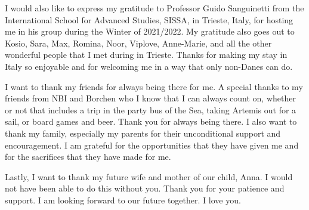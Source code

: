 I would also like to express my gratitude to Professor Guido Sanguinetti from the International School for Advanced Studies, SISSA, in Trieste, Italy, for hosting me in his group during the Winter of 2021/2022. My gratitude also goes out to Kosio, Sara, Max, Romina, Noor, Viplove, Anne-Marie, and all the other wonderful people that I met during in Trieste. Thanks for making my stay in Italy so enjoyable and for welcoming me in a way that only non-Danes can do.

I want to thank my friends for always being there for me. A special thanks to my friends from NBI and Borchen who I know that I can always count on, whether or not that includes a trip in the party bus of the Sea, taking Artemis out for a sail, or board games and beer. Thank you for always being there. I also want to thank my family, especially my parents for their unconditional support and encouragement. I am grateful for the opportunities that they have given me and for the sacrifices that they have made for me.

Lastly, I want to thank my future wife and mother of our child, Anna. I would not have been able to do this without you. Thank you for your patience and support. I am looking forward to our future together. I love you.
